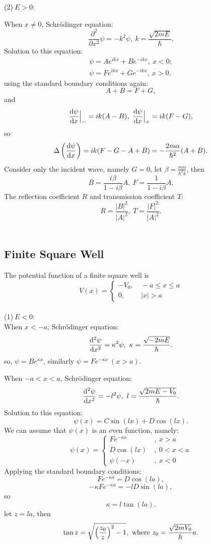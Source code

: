 \documentclass[12pt, 
]{article}
\begin{document}
\noindent (2)$~E>0$:

\noindent When $x\neq 0$, Schr\"odinger equation:
\[
	\frac{\partial^2}{\partial x^2}\psi=-k^2\psi, ~k=\frac{\sqrt{2mE}}{\hbar}.
\]
Solution to this equation:
\begin{eqnarray*}
	\psi=Ae^{ikx}+Be^{-ikx},~x<0;\\
	\psi=Fe^{ikx}+Ge^{-ikx},~x>0,
\end{eqnarray*}
using the standard boundary conditions again:
\[
	A+B=F+G,
\]
and
\[
	\frac{{\rm d}\psi}{{\rm d}x}\Big|_{-}=ik(A-B),~\frac{{\rm d}\psi}{{\rm d}x}\Big|_+=ik(F-G),
\]
so
\[
	\Delta\left(\frac{{\rm d}\psi}{{\rm d}x}\right)=ik(F-G-A+B)=-\frac{2m\alpha}{\hbar^2}(A+B).
\]
Consider only the incident wave, namely $G=0$, let $\displaystyle\beta=\frac{m\alpha}{\hbar^2k}$, then
\[
	B=\frac{i\beta}{1-i\beta}A,~F=\frac{1}{1-i\beta}A.
\]
The reflection coefficient $R$ and transmission coefficient $T$:
\[
	R=\frac{|B|^2}{|A|^2},~T=\frac{|F|^2}{|A|^2}.
\]
~\\

\subsection{Finite Square Well}
The potential function of a finite square well is 
\[
	V(x)=\left\{
	\begin{array}{rl}
		-V_0,&~-a\leqslant x\leqslant a\\
		0,&~|x|>a
	\end{array}
	\right.
\]
~\\
\noindent (1)$~E<0$:
~\\\noindent When $x<-a$, Schr\"odinger equation:
\[
	\frac{{\rm d}^2\psi}{{\rm d}x^2}=\kappa^2\psi, ~\kappa=\frac{\sqrt{-2mE}}{\hbar}.
\]
so, $\psi=Be^{\kappa x}$, similarly $\psi=Fe^{-\kappa x}~(x>a)$.

\noindent When $-a<x<a$, Schr\"odinger equation:
\[
	\frac{{\rm d}^2\psi}{{\rm d}x^2}=-l^2\psi, ~l=\frac{\sqrt{2m{E-V_0}}}{\hbar}.
\]
Solution to this equation:
\[
	\psi(x)=C\sin(lx)+D\cos(lx).
\]
We can assume that $\psi(x)$ is an even function, namely:
\[
	\psi(x)=\left\{
	\begin{array}{ll}
		Fe^{-\kappa x}&~,~x>a\\
		D\cos(lx)&~,~0<x<a\\
		\psi(-x)&~,~x<0
	\end{array}
	\right.
\]
Applying the standard boundary conditions:
\[
	Fe^{-\kappa a} = D \cos(la),
\]
\[
	-\kappa F e^{-\kappa a}=-lD\sin(la),
\]
so \[
	\kappa=l\tan(la).
\]
let $z=la$, then
\[
	\tan z=\sqrt{\left(\frac{z_0}{z}\right)^2-1}, ~{\rm where}~z_0=\frac{\sqrt{2mV_0}}{\hbar}a.
\]
\end{document}
